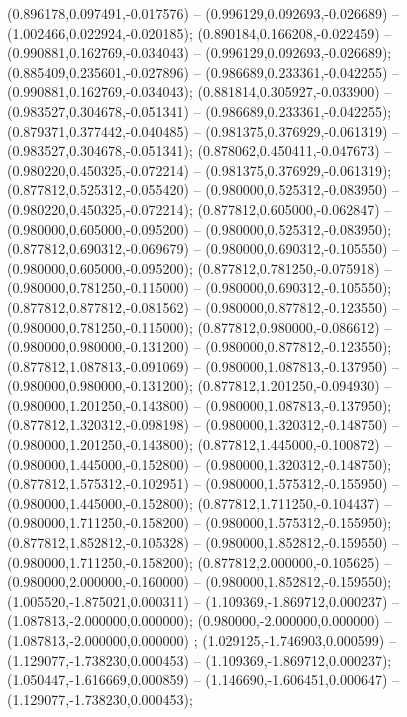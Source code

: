  (0.896178,0.097491,-0.017576) -- (0.996129,0.092693,-0.026689) -- (1.002466,0.022924,-0.020185);
 (0.890184,0.166208,-0.022459) -- (0.990881,0.162769,-0.034043) -- (0.996129,0.092693,-0.026689);
 (0.885409,0.235601,-0.027896) -- (0.986689,0.233361,-0.042255) -- (0.990881,0.162769,-0.034043);
 (0.881814,0.305927,-0.033900) -- (0.983527,0.304678,-0.051341) -- (0.986689,0.233361,-0.042255);
 (0.879371,0.377442,-0.040485) -- (0.981375,0.376929,-0.061319) -- (0.983527,0.304678,-0.051341);
 (0.878062,0.450411,-0.047673) -- (0.980220,0.450325,-0.072214) -- (0.981375,0.376929,-0.061319);
 (0.877812,0.525312,-0.055420) -- (0.980000,0.525312,-0.083950) -- (0.980220,0.450325,-0.072214);
 (0.877812,0.605000,-0.062847) -- (0.980000,0.605000,-0.095200) -- (0.980000,0.525312,-0.083950);
 (0.877812,0.690312,-0.069679) -- (0.980000,0.690312,-0.105550) -- (0.980000,0.605000,-0.095200);
 (0.877812,0.781250,-0.075918) -- (0.980000,0.781250,-0.115000) -- (0.980000,0.690312,-0.105550);
 (0.877812,0.877812,-0.081562) -- (0.980000,0.877812,-0.123550) -- (0.980000,0.781250,-0.115000);
 (0.877812,0.980000,-0.086612) -- (0.980000,0.980000,-0.131200) -- (0.980000,0.877812,-0.123550);
 (0.877812,1.087813,-0.091069) -- (0.980000,1.087813,-0.137950) -- (0.980000,0.980000,-0.131200);
 (0.877812,1.201250,-0.094930) -- (0.980000,1.201250,-0.143800) -- (0.980000,1.087813,-0.137950);
 (0.877812,1.320312,-0.098198) -- (0.980000,1.320312,-0.148750) -- (0.980000,1.201250,-0.143800);
 (0.877812,1.445000,-0.100872) -- (0.980000,1.445000,-0.152800) -- (0.980000,1.320312,-0.148750);
 (0.877812,1.575312,-0.102951) -- (0.980000,1.575312,-0.155950) -- (0.980000,1.445000,-0.152800);
 (0.877812,1.711250,-0.104437) -- (0.980000,1.711250,-0.158200) -- (0.980000,1.575312,-0.155950);
 (0.877812,1.852812,-0.105328) -- (0.980000,1.852812,-0.159550) -- (0.980000,1.711250,-0.158200);
 (0.877812,2.000000,-0.105625) -- (0.980000,2.000000,-0.160000) -- (0.980000,1.852812,-0.159550);
 (1.005520,-1.875021,0.000311) -- (1.109369,-1.869712,0.000237) -- (1.087813,-2.000000,0.000000);
 (0.980000,-2.000000,0.000000) -- (1.087813,-2.000000,0.000000) ;
 (1.029125,-1.746903,0.000599) -- (1.129077,-1.738230,0.000453) -- (1.109369,-1.869712,0.000237);
 (1.050447,-1.616669,0.000859) -- (1.146690,-1.606451,0.000647) -- (1.129077,-1.738230,0.000453);
